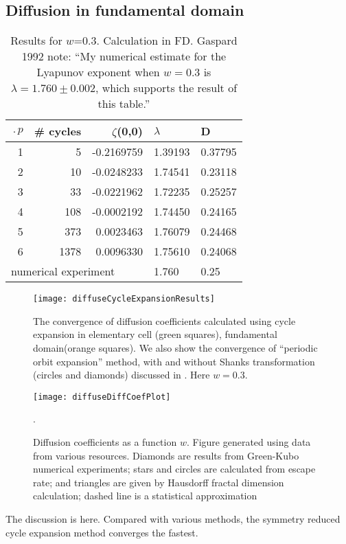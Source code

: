 \documentclass[aps,pre,
                showpacs,
                twocolumn,
                groupedaddress,
                floatfix]{revtex4-1}
\begin{document}
\subsection{Diffusion in fundamental domain}
\begin{table}[htbp]
\hfill
{}
\begin{tabular}{|r|r|r|l|l|}
\hline
$\period{p}$ & \# cycles & $\zeta$(0,0) & $\lambda$ & D \\ \hline\hline
1      & 5      & -0.2169759 & 1.39193 & 0.37795 \\
2      & 10     & -0.0248233 & 1.74541 & 0.23118\\
3      & 33     & -0.0221962 & 1.72235 & 0.25257\\
4      & 108    & -0.0002192 & 1.74450 & 0.24165\\
5      & 373    &  0.0023463 & 1.76079 & 0.24468\\
6      & 1378   &  0.0096330 & 1.75610 & 0.24068\\ \hline\hline
\multicolumn{3}{|l|}{numerical experiment}
                           & 1.760 & 0.25
\\ \hline
\end{tabular}

\caption{\label{TCELL2}
  Results for $w$=0.3. Calculation in FD. Gaspard 1992
  note: ``My numerical estimate for the Lyapunov exponent when $w=0.3$ is
  $\lambda = 1.760 \pm 0.002$, which supports the result of this table.''
}
\end{table}

\begin{figure}[htbp]
  \texttt{[image: diffuseCycleExpansionResults]}
  \caption[]{\label{fig-results} The convergence of diffusion coefficients
  calculated using cycle expansion in elementary cell (green squares),
  fundamental domain(orange squares). We
  also show the convergence of ``periodic orbit expansion'' method, with and
  without Shanks transformation (circles and diamonds) discussed in
  . Here $w = 0.3$.
  }
\end{figure}

\begin{figure}
\texttt{[image: diffuseDiffCoefPlot]}
  \caption[]{\label{fig-results} Diffusion coefficients as a function $w$.
  Figure generated using data from various resources. Diamonds are results from
  Green-Kubo numerical experiments; stars and
  circles are calculated from escape rate; and triangles are
  given by Hausdorff fractal dimension calculation; dashed line
  is a statistical approximation}.
\end{figure}
The discussion is here. Compared with various methods, the symmetry reduced
cycle expansion method converges the fastest.
\end{document}
